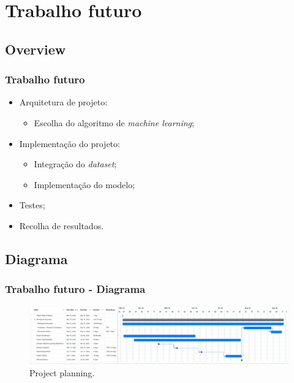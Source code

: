 \documentclass{beamer}
\begin{document}
\section[FutureWork]{Trabalho futuro}
\subsection{Overview}
\begin{frame}
\frametitle{Trabalho futuro}

\begin{itemize}
	\item Arquitetura de projeto:
		  \begin{itemize}
			  \item Escolha do algoritmo de \textit{machine learning};
		  \end{itemize} 
	\item Implementação do projeto:
		  \begin{itemize}
		      \item Integração do \textit{dataset};
		      \item Implementação do modelo;
		  \end{itemize}
	\item Testes;
	\item Recolha de resultados.
\end{itemize}

\end{frame}

\subsection{Diagrama}
\begin{frame}
\frametitle{Trabalho futuro - Diagrama}

\begin{figure}[H]
    \begin{center}
        \includegraphics[scale=0.14]{./figures/planning}
        \caption{Project planning.}
    \end{center}
\end{figure}


\end{frame}
\end{document}
